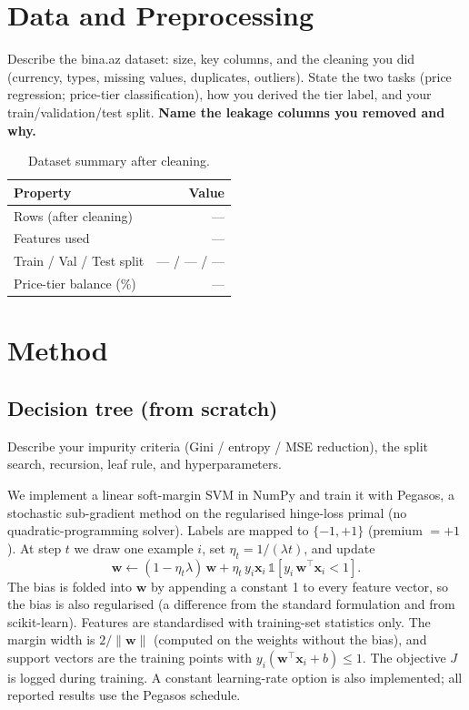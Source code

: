 \documentclass[10pt,twocolumn,a4paper]{article}
\begin{document}
\section{Data and Preprocessing}
Describe the bina.az dataset: size, key columns, and the cleaning you
did (currency, types, missing values, duplicates, outliers). State the
two tasks (price regression; price-tier classification), how you derived
the tier label, and your train/validation/test split. \textbf{Name the
leakage columns you removed and why.}

\begin{table}[t]
  \centering
  \caption{Dataset summary after cleaning.}
  \label{tab:data}
  \begin{tabular}{@{}lr@{}}
    \toprule
    Property & Value \\
    \midrule
    Rows (after cleaning)       & --- \\
    Features used               & --- \\
    Train / Val / Test split    & --- / --- / --- \\
    Price-tier balance (\%)     & --- \\
    \bottomrule
  \end{tabular}
\end{table}

\section{Method}
\subsection{Decision tree (from scratch)}
Describe your impurity criteria (Gini / entropy / MSE reduction), the
split search, recursion, leaf rule, and hyperparameters.

We implement a linear soft-margin SVM in NumPy and train it with Pegasos,
a stochastic sub-gradient method on the regularised hinge-loss primal
(no quadratic-programming solver). Labels are mapped to $\{-1,+1\}$
(premium $=+1$). At step $t$ we draw one example $i$, set
$\eta_t = 1/(\lambda t)$, and update
\begin{equation}
  \mathbf{w} \leftarrow (1-\eta_t\lambda)\,\mathbf{w}
  + \eta_t\, y_i \mathbf{x}_i \,\mathbb{1}\!\left[y_i\,\mathbf{w}^{\top}\mathbf{x}_i < 1\right].
\end{equation}
The bias is folded into $\mathbf{w}$ by appending a constant 1 to every
feature vector, so the bias is also regularised (a difference from the
standard formulation and from scikit-learn). Features are standardised
with training-set statistics only. The margin width is $2/\lVert\mathbf{w}\rVert$
(computed on the weights without the bias), and support vectors are the
training points with $y_i(\mathbf{w}^{\top}\mathbf{x}_i+b)\le 1$. The
objective $J$ is logged during training. A constant learning-rate option
is also implemented; all reported results use the Pegasos schedule.
\end{document}
